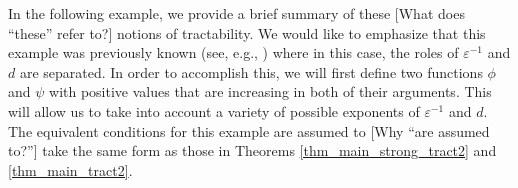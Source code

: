 \documentclass[sort&compress]{elsarticle}
\newcommand{\peter}[1]{\begingroup\color{violet}#1\endgroup}
\newcommand{\kachi}[1]{\begingroup\color{ForestGreen}#1\endgroup}
\begin{document}
\kachi{In the following example, we provide a brief summary of these \peter{[What does ``these'' refer to?]} notions of tractability. We would like to emphasize that this example was previously known (see, e.g., \cite{GW06}) where in this case, the roles of $\varepsilon^{-1}$ and $d$ are separated. In order to accomplish this, we will first define two functions $\phi$ and $\psi$ with positive values that are increasing in both of their arguments. This will allow us to take into account a variety of possible exponents of $\varepsilon^{-1}$ and $d$.
The equivalent conditions for this example are assumed to \peter{[Why ``are assumed to?'']} take the same form as those in Theorems \ref{thm_main_strong_tract2} and \ref{thm_main_tract2}.}
\end{document}
